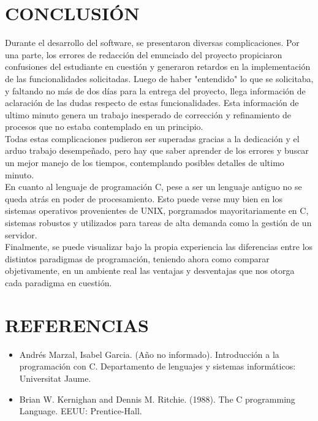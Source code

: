 \documentclass[12pt,letterpaper]{article}
\begin{document}
\section{CONCLUSIÓN}
Durante el desarrollo del software, se presentaron diversas complicaciones. Por una parte, los errores de redacción del enunciado del proyecto propiciaron confusiones del estudiante en cuestión y generaron retardos en la implementación de las funcionalidades solicitadas. Luego de haber "entendido" lo que se solicitaba, y faltando no más de dos días para la entrega del proyecto, llega información de aclaración de las dudas respecto de estas funcionalidades. Esta información de ultimo minuto genera un trabajo inesperado de corrección y refinamiento de procesos que no estaba contemplado en un principio. \\

Todas estas complicaciones pudieron ser superadas gracias a la dedicación y el arduo trabajo desempeñado, pero hay que saber aprender de los errores y buscar un mejor manejo de los tiempos, contemplando posibles detalles de ultimo minuto.\\

En cuanto al lenguaje de programación C, pese a ser un lenguaje antiguo no se queda atrás en poder de procesamiento. Esto puede verse muy bien en los sistemas operativos provenientes de UNIX, porgramados mayoritariamente en C, sistemas robustos y utilizados para tareas de alta demanda como la gestión de un servidor. \\

Finalmente, se puede visualizar bajo la propia experiencia las diferencias entre los distintos paradigmas de programación, teniendo ahora como comparar objetivamente, en un ambiente real las ventajas y desventajas que nos otorga cada paradigma en cuestión.

\section{REFERENCIAS}
\begin{itemize}
\item Andrés Marzal, Isabel Garcia. (Año no informado). Introducción a la programación con
C. Departamento de lenguajes y sistemas informáticos: Universitat Jaume.
\item Brian W. Kernighan and Dennis M. Ritchie. (1988). The C programming Language.
EEUU: Prentice-Hall.
\end{itemize}

\newpage

\clearpage
{}


\end{document}
